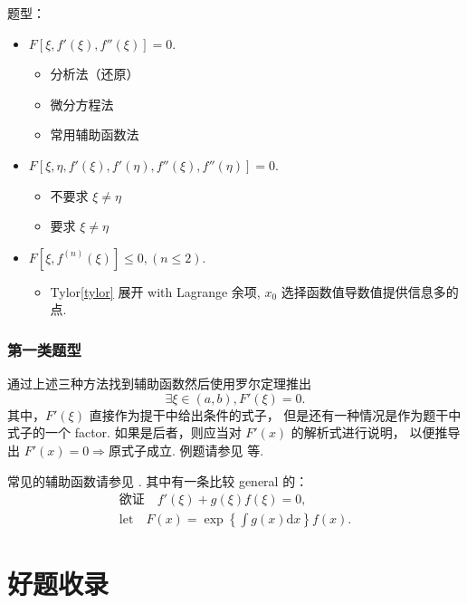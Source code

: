题型：
\begin{itemize}
    \item $F\left[\xi, f'(\xi), f''(\xi)\right] = 0$.
        \begin{itemize}
            \item 分析法（还原）
            \item 微分方程法
            \item 常用辅助函数法
        \end{itemize}
    \item $F\left[\xi, \eta, f'(\xi), f'(\eta), f''(\xi), f''(\eta)\right] = 0$.
        \begin{itemize}
            \item 不要求 $\xi \neq \eta$
            \item 要求 $\xi \neq \eta$
        \end{itemize}
    \item $F\left[\xi, f^{(n)}(\xi)\right] \leq 0, (n \leq 2)$.
        \begin{itemize}
            \item Tylor\ref{tylor} 展开 with Lagrange 余项, 
                  $x_0$ 选择函数值导数值提供信息多的点.
        \end{itemize}
\end{itemize}

\subsubsection{第一类题型}

通过上述三种方法找到辅助函数然后使用罗尔定理推出
\[
    \exists \xi \in \left(a, b\right), F'(\xi) = 0.
\]
其中，$F'(\xi)$ 直接作为提干中给出条件的式子，
但是还有一种情况是作为题干中式子的一个 factor.
如果是后者，则应当对 $F'(x)$ 的解析式进行说明，
以便推导出 $F'(x) = 0 \Rightarrow \mbox{原式子成立}$.
例题请参见 \cite[page 82, pdf 93, example 2]{we} 等.

常见的辅助函数请参见 \cite[page 83, pdf 94]{we}.
其中有一条比较 general 的：
\begin{align*}
    \mbox{欲证}\quad f'(\xi) + g(\xi) f(\xi) = 0,  \\
    \mbox{let} \quad 
    F(x) = \exp \left\{\int g(x) \mbox{d}x\right\} f(x).
\end{align*}

\section{好题收录}

